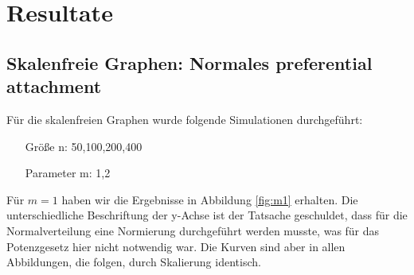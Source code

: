 \documentclass[10pt]{article}
\begin{document}
\section{Resultate}
\subsection{Skalenfreie Graphen: Normales preferential attachment}
Für die skalenfreien Graphen wurde folgende Simulationen durchgeführt: 
\begin{itemize}
\item[\quad Größe n:] 50,100,200,400
\item[\quad Parameter m:] 1,2
\end{itemize}
Für $m=1$ haben wir die Ergebnisse in Abbildung \ref{fig:m1} erhalten. Die unterschiedliche Beschriftung der y-Achse ist der Tatsache geschuldet, dass für die Normalverteilung eine Normierung durchgeführt werden musste, was für das Potenzgesetz hier nicht notwendig war. Die Kurven sind aber in allen Abbildungen, die folgen, durch Skalierung identisch.
\end{document}
